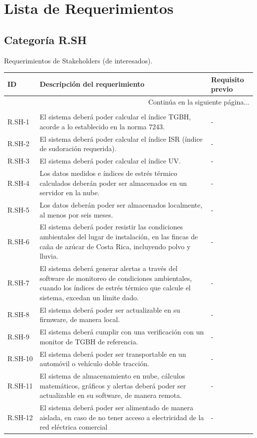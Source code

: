 \documentclass{article}%
\begin{document}
%
\normalsize%
\section{Lista de Requerimientos}%
\label{sec:ListadeRequerimientos}%
\subsection{Categoría R.SH}%
\label{subsec:CategoraR.SH}%
Requerimientos de Stakeholders (de interesados).\newline%
\newline%
%
\begin{longtable}{|p{2cm}|p{9cm}|p{2.5cm}|}%
\hline%
ID&Descripción del requerimiento&Requisito previo\\%
\hline%
\endhead%
\hline%
\multicolumn{3}{|r|}{Continúa en la siguiente página...}\\%
\hline%
\endfoot%
\hline%
\multicolumn{3}{|r|}{Fin de la tabla}\\%
\hline%
\endlastfoot%
R.SH{-}1& El sistema deberá poder calcular el índice TGBH, acorde a lo establecido en la norma 7243.&{-}\\%
\hline%
R.SH{-}2& El sistema deberá poder calcular el índice ISR (índice de sudoración requerida).&{-}\\%
\hline%
R.SH{-}3& El sistema deberá poder calcular el índice UV.&{-}\\%
\hline%
R.SH{-}4& Los datos medidos e índices de estrés térmico calculados deberán poder ser almacenados en un servidor en la nube.&{-}\\%
\hline%
R.SH{-}5& Los datos deberán poder ser almacenados localmente, al menos por seis meses.&{-}\\%
\hline%
R.SH{-}6& El sistema deberá poder resistir las condiciones ambientales del lugar de instalación, en las fincas de caña de azúcar de Costa Rica, incluyendo polvo y lluvia.&{-}\\%
\hline%
R.SH{-}7& El sistema deberá generar alertas a través del software de monitoreo de condiciones ambientales, cuando los índices de estrés térmico que calcule el sistema, excedan un límite dado.&{-}\\%
\hline%
R.SH{-}8& El sistema deberá poder ser actualizable en su firmware, de manera local.&{-}\\%
\hline%
R.SH{-}9& El sistema deberá cumplir con una verificación con un monitor de TGBH de referencia.&{-}\\%
\hline%
R.SH{-}10& El sistema deberá poder ser transportable en un automóvil o vehículo doble tracción.&{-}\\%
\hline%
R.SH{-}11& El sistema de almacenamiento en nube, cálculos matemáticos, gráficos y alertas deberá poder ser actualizable en su software, de manera remota.&{-}\\%
\hline%
R.SH{-}12& El sistema deberá poder ser alimentado de manera aislada, en caso de no tener acceso a electricidad de la red eléctrica comercial&{-}\\%
\hline%
\end{longtable}
\end{document}
